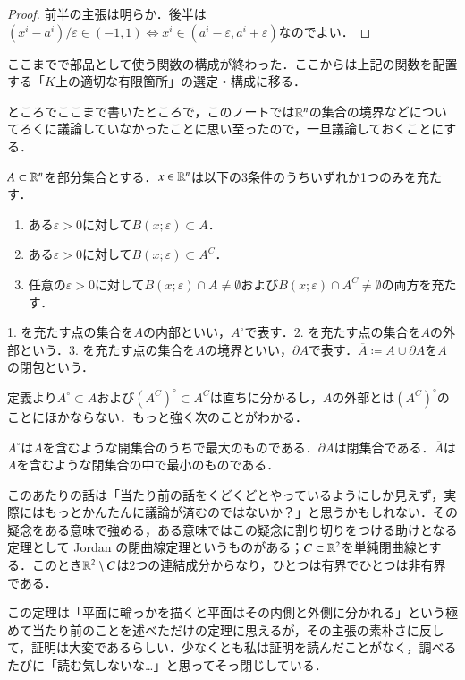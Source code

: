 \begin{proof}
前半の主張は明らか．後半は$(x^i-a^i)/\varepsilon \in (-1,1) \Leftrightarrow x^i \in (a^i - \varepsilon, a^i + \varepsilon)$なのでよい．
\end{proof}

ここまでで部品として使う関数の構成が終わった．ここからは上記の関数を配置する「$K$上の適切な有限箇所」の選定・構成に移る．

ところでここまで書いたところで，このノートでは$\mathbb{R}^n$の集合の境界などについてろくに議論していなかったことに思い至ったので，一旦議論しておくことにする．

\begin{defi}
$A \subset \mathbb{R}^n$を部分集合とする．$x \in \mathbb{R}^n$は以下の3条件のうちいずれか1つのみを充たす．
\begin{enumerate}
\item ある$\varepsilon >0$に対して$B(x;\varepsilon) \subset A$．
\item ある$\varepsilon >0$に対して$B(x;\varepsilon) \subset A^C$．
\item 任意の$\varepsilon >0$に対して$B(x;\varepsilon) \cap A \neq \emptyset$および$B(x;\varepsilon) \cap A^C \neq \emptyset$の両方を充たす．
\end{enumerate}
1. を充たす点の集合を$A$の内部といい，$A^\circ$で表す．2. を充たす点の集合を$A$の外部という．3. を充たす点の集合を$A$の境界といい，$\partial A$で表す．$\overline A \coloneqq A \cup \partial A$を$A$の閉包という．
\end{defi}

定義より$A^\circ \subset A$および$(A^C)^\circ \subset A^C$は直ちに分かるし，$A$の外部とは$(A^C)^\circ$のことにほかならない．もっと強く次のことがわかる．

\begin{que}
$A^\circ$は$A$を含むような開集合のうちで最大のものである．$\partial A$は閉集合である．$\overline A$は$A$を含むような閉集合の中で最小のものである．
\end{que}

\begin{que}[*]
このあたりの話は「当たり前の話をくどくどとやっているようにしか見えず，実際にはもっとかんたんに議論が済むのではないか？」と思うかもしれない．その疑念をある意味で強める，ある意味ではこの疑念に割り切りをつける助けとなる定理として Jordan の閉曲線定理というものがある；$C \subset \mathbb{R}^2$を単純閉曲線とする．このとき$\mathbb{R}^2 \setminus C$は2つの連結成分からなり，ひとつは有界でひとつは非有界である．

この定理は「平面に輪っかを描くと平面はその内側と外側に分かれる」という極めて当たり前のことを述べただけの定理に思えるが，その主張の素朴さに反して，証明は大変であるらしい．少なくとも私は証明を読んだことがなく，調べるたびに「読む気しないな…」と思ってそっ閉じしている．
\end{que}

